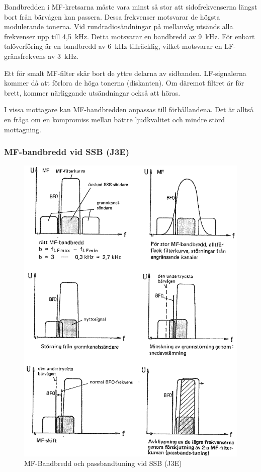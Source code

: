 Bandbredden i MF-kretsarna måste vara minst så stor att sidofrekvenserna
längst bort från bärvågen kan passera.
Dessa frekvenser motsvarar de högsta modulerande tonerna.
Vid rundradiosändningar på mellanvåg utsänds alla frekvenser upp till 4,5~kHz.
Detta motsvarar en bandbredd av 9~kHz.
För enbart talöverföring är en bandbredd av 6~kHz tillräcklig, vilket
motsvarar en LF-gränsfrekvens av 3~kHz.

Ett för smalt MF-filter skär bort de yttre delarna av sidbanden.
LF-signalerna kommer då att förlora de höga tonerna (diskanten).
Om däremot filtret är för brett, kommer närliggande utsändningar också att
höras.

I vissa mottagare kan MF-bandbredden anpassas till förhållandena.
Det är alltså en fråga om en kompromiss mellan bättre ljudkvalitet och
mindre störd mottagning.

\subsubsection{MF-bandbredd vid SSB (J3E)}

\begin{figure}
  \includegraphics[width=\textwidth]{images/cropped_pdfs/bild_2_4-27.pdf}
  \caption{MF-Bandbredd och passbandtuning vid SSB (J3E)}
  \label{fig:bildII4-27}
\end{figure}

